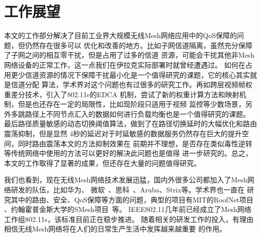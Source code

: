 \section{工作展望}
本文的工作部分解决了目前工业界大规模无线Mesh网络应用中的QoS保障的问题，但仍然存在很多可以
优化和改善的地方。比如子网信道隔离，虽然充分保障了子网之间的相互零干扰，但是占用了过多的信道
资源，可能会干扰其他非Mesh网络设备的正常工作，这一点我们在伊拉克实际部署时就曾经遭遇过。
如何在占用更少信道资源的情况下保障干扰最小化是一个值得研究的课题，它的核心其实就是信道分配
算法，学术界对这个问题也有过很多的研究工作。再如跨层视频帧权重差分技术，引入了802.11e的EDCA
机制，尝试了新的权重计算方法和映射机制，但是也还存在一定的局限性，比如现阶段只适用于视频
监控等少数场景，另外多跳路径上不同节点汇入的数据如何进行负载均衡也是一个值得研究的课题。
最后路径质量敏感的动态切换阈值算法，做到了在路径切换延时的大幅优化和路由震荡抑制，但是显然
4秒的延迟对于时延敏感的数据服务仍然存在巨大的提升空间，同时路由震荡本文的方法抑制效果在
前期并不理想，是否存在类似毒性逆转等传统网络中使用的方法可以更好的解决此问题也是值得
进一步研究的。总之，本文的工作取得了显著的成果，但还存在大量的问题值得研究。

我们也看到，现在无线Mesh网络技术发展迅猛，国内外很多公司都加入了Mesh网络研发的队伍，比如华为、
微软~\cite{microsoft}、思科~\cite{cisco}、Aruba、Strix等。学术界也一直在
研究其中的路由、安全、QoS保障等方面的问题，典型的项目有MIT的RoofNet项目~\cite{roofnet}
、约翰霍普金斯大学的SMesh项目~\cite{SMesh}等。
IEEE802.11几年前已经成立了Mesh网络工作组802.11s，该标准目前正在稳步推进。
随着相关的研发工作的投入，有理由相信无线Mesh网络将在人们的日常生产生活中发挥越来越重要
的作用。

